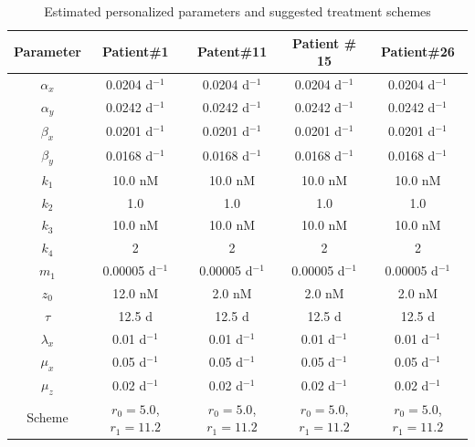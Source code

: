 \begin{table}[t]
\caption{Estimated personalized parameters and suggested treatment schemes \label{prostate2}}
\centering
\begin{tabular}{c|c|c|c|c}
\hline\hline
Parameter  & Patient\#1 & Patent\#11 & Patient \# 15 & Patient\#26  \\\hline\hline
$\alpha_x$ & 0.0204 d$^{-1}$ & 0.0204 d$^{-1}$ & 0.0204 d$^{-1}$& 0.0204 d$^{-1}$ \\
$\alpha_y$ & 0.0242 d$^{-1}$ &  0.0242 d$^{-1}$&  0.0242 d$^{-1}$&  0.0242 d$^{-1}$  \\
$\beta_x$  & 0.0201 d$^{-1}$ & 0.0201 d$^{-1}$ & 0.0201 d$^{-1}$& 0.0201 d$^{-1}$ \\
$\beta_y$  & 0.0168 d$^{-1}$ &0.0168 d$^{-1}$ &0.0168 d$^{-1}$ &0.0168 d$^{-1}$  \\
$k_1$     & 10.0 nM & 10.0 nM & 10.0 nM& 10.0 nM  \\
$k_2$     & 1.0 & 1.0 & 1.0 & 1.0 \\
$k_3$     & 10.0 nM & 10.0 nM & 10.0 nM& 10.0 nM  \\
$k_4$     &  2 & 2 & 2 & 2   \\
$m_1$     & 0.00005 d$^{-1}$ &  0.00005 d$^{-1}$ &  0.00005 d$^{-1}$ &  0.00005 d$^{-1}$  \\
$z_0$     & 12.0 nM & 2.0 nM & 2.0 nM & 2.0 nM  \\
$\tau$     & 12.5 d & 12.5 d & 12.5 d & 12.5 d  \\
$\lambda_x$     & 0.01 d$^{-1}$ & 0.01 d$^{-1}$ & 0.01 d$^{-1}$ & 0.01 d$^{-1}$ \\
$\mu_x$     & 0.05 d$^{-1}$ & 0.05 d$^{-1}$ & 0.05 d$^{-1}$ & 0.05 d$^{-1}$\\
$\mu_z$     & 0.02 d$^{-1}$ & 0.02 d$^{-1}$  & 0.02 d$^{-1}$ & 0.02 d$^{-1}$  \\
\hline\hline
Scheme     & $r_0=5.0$, $r_1=11.2$ & $r_0=5.0$, $r_1=11.2$ & $r_0=5.0$, $r_1=11.2$ & $r_0=5.0$, $r_1=11.2$ \\
\hline\hline
\end{tabular}
\end{table}



